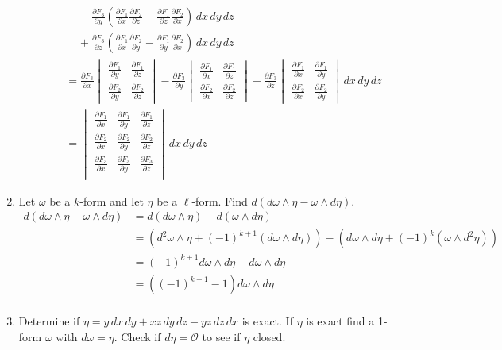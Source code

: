 \documentclass{article}
\newcommand{\partis}[2]{\frac{\partial #2}{\partial #1}}
\begin{document}
\begin{enumerate}
\begin{enumerate}
\begin{align*}
                &\; \; \; \; - \partis{y}{F_3} (\partis{x}{F_1} \partis{z}{F_2} - \partis{z}{F_1} \partis{x}{F_2}) \, dx \, dy \, dz \\
                &\; \; \; \; + \partis{z}{F_3} (\partis{x}{F_1} \partis{y}{F_2} - \partis{y}{F_1} \partis{x}{F_2})\, dx \, dy \, dz \\
                &=  \partis{x}{F_3} \begin{vmatrix} \partis{y}{F_1} & \partis{z}{F_1} \\ \partis{y}{F_2} & \partis{z}{F_2} \end{vmatrix} 
                - \partis{y}{F_3} \begin{vmatrix} \partis{x}{F_1} & \partis{z}{F_1} \\ \partis{x}{F_2} & \partis{z}{F_2} \end{vmatrix}
                + \partis{z}{F_3} \begin{vmatrix} \partis{x}{F_1} & \partis{y}{F_1} \\ \partis{x}{F_2} & \partis{y}{F_2} \end{vmatrix} \, dx \, dy \, dz \\
                &=
                \begin{vmatrix}
                    \partis{x}{F_1} & \partis{y}{F_1} & \partis{z}{F_1} \\
                    \partis{x}{F_2} & \partis{y}{F_2} & \partis{z}{F_2} \\
                    \partis{x}{F_3} & \partis{y}{F_3} & \partis{z}{F_3} \\
                \end{vmatrix} \, dx \, dy \, dz
            \end{align*} 
    \end{enumerate}
    \newpage
    \item Let $\omega$ be a $k$-form and let $\eta$ be a $\ell$-form. Find $d(d\omega \wedge \eta - \omega \wedge d\eta)$.
        \begin{align*}
            d(d\omega \wedge \eta - \omega \wedge d\eta) &= d(d\omega \wedge \eta) - d(\omega \wedge d\eta) \\
            &= (d^2 \omega \wedge \eta + (-1)^{k+1} (d \omega \wedge d \eta)) - (d \omega \wedge d \eta + (-1)^k (\omega \wedge d^2 \eta)) \\
            &= (-1)^{k+1} d \omega \wedge d \eta - d \omega \wedge d \eta \\
            &= ((-1)^{k+1} - 1) d \omega \wedge d \eta \\
        \end{align*} 
    \newpage
    \item Determine if $\eta = y \, dx \, dy + xz \, dy \, dz - yz \, dz \, dx$ is exact. If $\eta$ is exact find a 1-form $\omega$ with $d\omega = \eta$.
    Check if $d\eta = \mathcal{O}$ to see if $\eta$ closed.


\end{enumerate}
\end{document}
